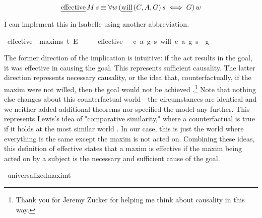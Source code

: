 \begin{isabellebody}
\begin{isamarkuptext}
\begin{definition}
$$\text{\emph{effective}} \, M \, s \equiv \forall w \, (\text{\emph{will}} \, (C, A, G) \, s \iff G) \, w$$

\end{definition}

I can implement this in Isabelle using another abbreviation.%
\end{isamarkuptext}\isamarkuptrue%
\isamarkupfalse%
\ effective\ {\isacharcolon}{\isacharcolon}\ {\isachardoublequoteopen}maxim{\isasymRightarrow}s{\isasymRightarrow}\ t{\isachardoublequoteclose}\ {\isacharparenleft}{\isachardoublequoteopen}E\ {\isacharunderscore}\ {\isacharunderscore}{\isachardoublequoteclose}{\isacharparenright}\isanewline
\ \ \ {\isachardoublequoteopen}effective\ \ {\isasymequiv}\ {\isasymlambda}{\isacharparenleft}c{\isacharcomma}\ a{\isacharcomma}\ g{\isacharparenright}\ s{\isachardot}\ {\isacharparenleft}{\isacharparenleft}will\ {\isacharparenleft}c{\isacharcomma}\ a{\isacharcomma}\ g{\isacharparenright}\ s{\isacharparenright}\ \isactrlbold {\isasymequiv}\ g{\isacharparenright}{\isachardoublequoteclose}\isanewline
%
%
\begin{isamarkuptext}%
The former direction of the implication is intuitive: if the act results in the goal, it was 
effective in causing the goal. This represents sufficient causality. The latter direction represents 
necessary causality, or the idea that, counterfactually, if the maxim were not willed, then the goal 
would not be achieved \citep{lewiscausality}.\footnote{Thank you for Jeremy Zucker for helping me 
think about causality in this way.}  Note that nothing else changes about this
counterfactual world—the circumstances are identical and we neither added additional theorems nor 
specified the model any further. This represents Lewis's idea of "comparative similarity,"  where 
a counterfactual is true if it holds at the most similar world \cite{lewiscounterfactuals}. 
In our case, this is just the world where everything is the same except the maxim is not acted on.
Combining these ideas, this definition of effective states that a maxim is effective if the 
maxim being acted on by a subject is the necessary and sufficient cause of the goal.%
\end{isamarkuptext}\isamarkuptrue%
\isamarkupfalse%
\ universalized{\isacharcolon}{\isacharcolon}{\isachardoublequoteopen}maxim{\isasymRightarrow}t{\isachardoublequoteclose}\ \ \isanewline

\end{isabellebody}
